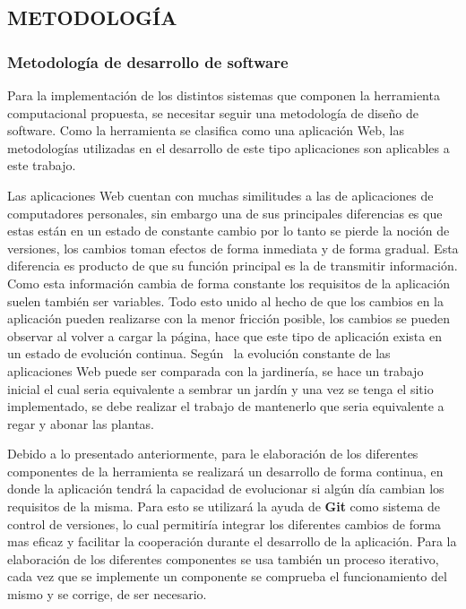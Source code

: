 
\subsection{METODOLOGÍA}
\subsubsection{Metodología de desarrollo de software}

Para la implementación de los distintos sistemas que componen la herramienta
computacional propuesta, se necesitar seguir una metodología de diseño de
software. Como la herramienta se clasifica como una aplicación Web, las
metodologías utilizadas en el desarrollo de este tipo aplicaciones son
aplicables a este trabajo.

Las aplicaciones Web cuentan con muchas similitudes a las de aplicaciones de
computadores personales, sin embargo una de sus principales diferencias es que
estas están en un estado de constante cambio por lo tanto
se pierde la noción de versiones, los cambios toman efectos de forma inmediata
y de forma gradual. Esta diferencia es producto de que su función principal es
la de transmitir información. Como esta información cambia de forma constante
los requisitos de la aplicación suelen también ser variables. Todo esto unido
al hecho de que los cambios en la aplicación pueden realizarse con la
menor fricción posible, los cambios se pueden observar al volver a cargar la
página, hace que este tipo de aplicación  exista en un estado de evolución
continua. Según \cite{pressman2002}\  la evolución constante de las aplicaciones
Web puede ser comparada con la jardinería, se hace un trabajo inicial el cual
seria equivalente a sembrar un jardín y una vez se tenga el sitio implementado,
se debe realizar el trabajo de mantenerlo que seria equivalente a regar y
abonar las plantas.

Debido a lo presentado anteriormente, para le elaboración de los diferentes
componentes de la herramienta se realizará un desarrollo de forma continua,
en donde la aplicación tendrá la capacidad de evolucionar si algún día
cambian los requisitos de la misma. Para esto se utilizará la ayuda de
\textbf{Git} como sistema de control de versiones, lo cual permitiría integrar
los diferentes cambios de forma mas eficaz y facilitar la cooperación durante
el desarrollo de la aplicación. Para la elaboración de los diferentes
componentes se usa también un proceso iterativo, cada vez que se implemente
un componente se comprueba el funcionamiento del mismo y se corrige, de ser
necesario.


